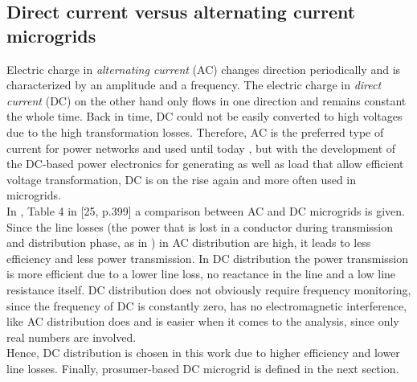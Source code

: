 \subsection{Direct current versus alternating current microgrids}
\label{subsec:acdc}
\par Electric charge in \textit{alternating current} (AC) changes direction periodically and is characterized by an amplitude and a frequency. The electric charge in \textit{direct current} (DC) on the other hand only flows in one direction and remains constant the whole time. Back in time, DC could not be easily converted to high voltages due to the high transformation losses. Therefore, AC is the preferred type of current for power networks and used until today \cite{mikieus}, but with the development of the DC-based power electronics for generating as well as load that allow efficient voltage transformation, DC is on the rise again and more often used in microgrids.
\\ In \cite{versus}, Table 4 in [25, p.399] a comparison between AC and DC microgrids is given. Since the line losses (the power that is lost in a conductor during transmission and distribution phase, as in \cite{lineloss}) in AC distribution are high, it leads to less efficiency and less power transmission. In DC distribution the power transmission is more efficient due to a lower line loss, no reactance in the line and a low line resistance itself. DC distribution does not obviously require frequency monitoring, since the frequency of DC is constantly zero, has no electromagnetic interference, like AC distribution does and is easier when it comes to the analysis, since only real numbers are involved. \\
Hence, DC distribution is chosen in this work due to higher efficiency and lower line losses. Finally, prosumer-based DC microgrid is defined in the next section.
